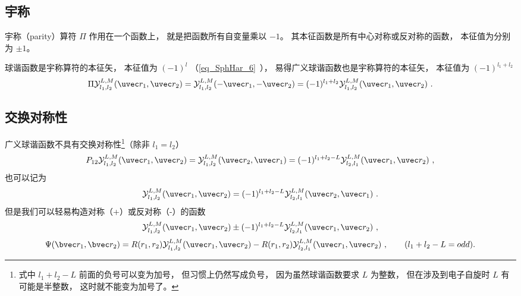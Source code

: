 \subsection{宇称}
宇称（parity）算符 $\Pi$ 作用在一个函数上， 就是把函数所有自变量乘以 $-1$。 其本征函数是所有中心对称或反对称的函数， 本征值为分别为 $\pm 1$。

球谐函数是宇称算符的本征矢， 本征值为 $(-1)^l$ （\autoref{eq_SphHar_6}~）， 易得广义球谐函数也是宇称算符的本征矢， 本征值为 $(-1)^{l_1+l_2}$
\begin{equation}\label{eq_GenYlm_6}
\Pi \mathcal{Y}_{l_1,l_2}^{L,M}(\uvec r_1, \uvec r_2) =  \mathcal{Y}_{l_1,l_2}^{L,M}(-\uvec r_1, -\uvec r_2) = (-1)^{l_1+l_2} \mathcal{Y}_{l_1,l_2}^{L,M}(\uvec r_1, \uvec r_2)~.
\end{equation}

\subsection{交换对称性}
广义球谐函数不具有交换对称性\footnote{式中 $l_1+l_2-L$ 前面的负号可以变为加号， 但习惯上仍然写成负号， 因为虽然球谐函数要求 $L$ 为整数， 但在涉及到电子自旋时 $L$ 有可能是半整数， 这时就不能变为加号了。}（除非 $l_1 = l_2$）
\begin{equation}\label{eq_GenYlm_4}
P_{12} \mathcal{Y}_{l_1,l_2}^{L,M}(\uvec r_1, \uvec r_2) = \mathcal{Y}_{l_1,l_2}^{L,M}(\uvec r_2, \uvec r_1) = 
(-1)^{l_1+l_2-L} \mathcal{Y}_{l_2,l_1}^{L,M}(\uvec r_1, \uvec r_2)~,
\end{equation}
也可以记为
\begin{equation}\label{eq_GenYlm_5}
\mathcal{Y}_{l_1,l_2}^{L,M}(\uvec r_1, \uvec r_2) = 
(-1)^{l_1+l_2-L} \mathcal{Y}_{l_2,l_1}^{L,M}(\uvec r_2, \uvec r_1)~.
\end{equation}
但是我们可以轻易构造对称（+）或反对称（-）的函数
\begin{equation}
\mathcal{Y}_{l_1,l_2}^{L,M}(\uvec r_1, \uvec r_2) \pm (-1)^{l_1+l_2-L}\mathcal{Y}_{l_2,l_1}^{L,M}(\uvec r_1, \uvec r_2)~,
\end{equation}
\begin{equation}
\Psi(\bvec r_1, \bvec r_2) = 
R(r_1, r_2)\mathcal{Y}_{l_1,l_2}^{L,M}(\uvec r_1, \uvec r_2) - R(r_1, r_2)\mathcal{Y}_{l_2,l_1}^{L,M}(\uvec r_1, \uvec r_2)~, \qquad (l_1+l_2-L = odd).
\end{equation}

